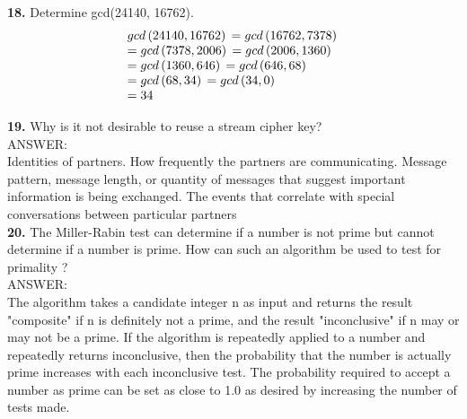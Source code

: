 \documentclass[paper=a4, fontsize=11pt]{scrartcl} %
\numberwithin{equation}{section} %
\numberwithin{figure}{section} %
\numberwithin{table}{section} %
\begin{document}
\textbf{18.} Determine gcd(24140, 16762).
\[\begin{array}{l}
gcd\left( {24140,{\rm{ }}16762} \right){\rm{ }} = {\rm{ }}gcd\left( {16762,{\rm{ }}7378} \right){\rm{ }}\\
 = {\rm{ }}gcd\left( {7378,{\rm{ }}2006} \right){\rm{ }} = {\rm{ }}gcd\left( {2006,{\rm{ }}1360} \right){\rm{ }}\\
 = {\rm{ }}gcd\left( {1360,{\rm{ }}646} \right){\rm{ }} = {\rm{ }}gcd{\rm{ }}\left( {646,{\rm{ }}68} \right){\rm{ }}\\
 = {\rm{ }}gcd\left( {68,{\rm{ }}34} \right){\rm{ }} = {\rm{ }}gcd\left( {34,{\rm{ }}0} \right){\rm{ }}\\
 = {\rm{ }}34
\end{array}\]


\textbf{19.} Why is it not desirable to reuse a stream cipher key?\\

ANSWER:\\
Identities of partners. How frequently the partners are communicating. Message pattern, message length, or quantity of messages that suggest important information is being exchanged. The events that correlate with special conversations between particular partners \\


\textbf{20.} The Miller-Rabin test can determine if a number is not prime but cannot determine if
a number is prime. How can such an algorithm be used to test for primality ?\\

ANSWER:\\
The algorithm takes a candidate integer n as input and returns the result "composite" if n is definitely not a prime, and the result "inconclusive" if n may or may not be a prime. If the algorithm is repeatedly applied to a number and repeatedly returns inconclusive, then the probability that the number is actually prime increases with each inconclusive test. The probability required to accept a number as prime can be set as close to 1.0 as desired by increasing the number of tests made. \\
\end{document}
